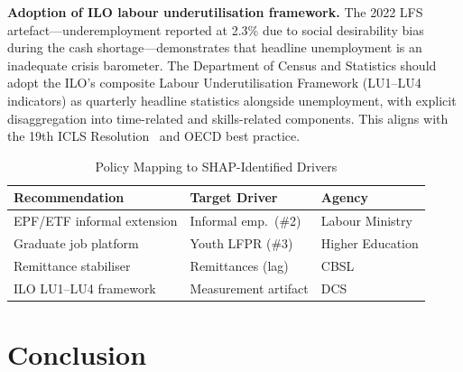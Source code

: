 \documentclass[sigconf]{acmart}
\begin{document}
\textbf{Adoption of ILO labour underutilisation framework.}
The 2022 LFS artefact---underemployment reported at 2.3\% due to
social desirability bias during the cash shortage---demonstrates that
headline unemployment is an inadequate crisis barometer. The Department
of Census and Statistics should adopt the ILO's composite Labour
Underutilisation Framework (LU1--LU4 indicators) as quarterly headline
statistics alongside unemployment, with explicit disaggregation into
time-related and skills-related components. This aligns with the 19th
ICLS Resolution~\cite{ilo2013} and OECD best practice.

\begin{table}[h]
\centering
\caption{Policy Mapping to SHAP-Identified Drivers}
\label{tab:policy}
\footnotesize
\setlength{\tabcolsep}{4pt}
\begin{tabular}{@{}lll@{}}
\toprule
\textbf{Recommendation} & \textbf{Target Driver} & \textbf{Agency} \\
\midrule
EPF/ETF informal extension  & Informal emp.\ (\#2)  & Labour Ministry \\
Graduate job platform       & Youth LFPR (\#3)      & Higher Education \\
Remittance stabiliser       & Remittances (lag)     & CBSL            \\
ILO LU1--LU4 framework      & Measurement artifact  & DCS             \\
\bottomrule
\end{tabular}
\end{table}

\section{Conclusion}
\end{document}
